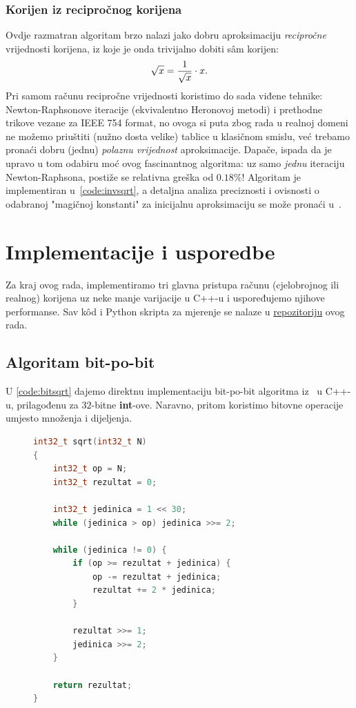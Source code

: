 \documentclass[12pt]{scrartcl}
\begin{document}
\subsubsection{Korijen iz recipročnog korijena}
Ovdje razmatran
algoritam brzo nalazi jako dobru aproksimaciju \emph{recipročne} vrijednosti korijena, iz koje je onda trivijalno dobiti s\^am korijen:
\begin{equation}
    \sqrt{x} = \frac{1}{\sqrt{x}} \cdot x\text.
\end{equation}
Pri samom računu recipročne vrijednosti koristimo do sada viđene tehnike: Newton-Raphsonove iteracije (ekvivalentno Heronovoj metodi) i prethodne
trikove vezane za IEEE 754 format, no ovoga si puta zbog rada u realnoj domeni ne možemo priuštiti (nužno dosta velike) tablice u klasičnom smislu,
već trebamo pronaći dobru (jednu)
\emph{polaznu vrijednost} aproksimacije. Dapače, ispada da je upravo u tom odabiru moć ovog fascinantnog algoritma: uz samo \emph{jednu} iteraciju
Newton-Raphsona, postiže se relativna greška od $0.18\%$! Algoritam je implementiran u~\autoref{code:invsqrt}, a detaljna analiza preciznosti i ovisnosti
o odabranoj "magičnoj konstanti" za inicijalnu aproksimaciju se može pronaći u~\cite{lomont}.

\section{Implementacije i usporedbe}
Za kraj ovog rada, implementiramo tri glavna pristupa računu (cjelobrojnog ili realnog) korijena uz neke manje varijacije
u C++-u i uspoređujemo njihove performanse. Sav k\^od i Python skripta za mjerenje se nalaze u
\href{https://github.com/mraguzin/mathsoft-esej2}{repozitoriju} ovog rada.

\subsection{Algoritam bit-po-bit}
U \autoref{code:bitsqrt} dajemo direktnu implementaciju bit-po-bit algoritma iz~\cite{guysqrt} u C++-u, pri\-la\-gođe\-nu za $32$-bitne \textbf{int}-ove.
Naravno, pritom koristimo bitovne operacije umjesto množenja i dijeljenja.
\begin{figure}[h]
\begin{lstlisting}[language=C++, label=code:bitsqrt, caption=Bit-po-bit algoritam u C++-u]
int32_t sqrt(int32_t N)
{
	int32_t op = N;
	int32_t rezultat = 0;

	int32_t jedinica = 1 << 30;
	while (jedinica > op) jedinica >>= 2;

	while (jedinica != 0) {
		if (op >= rezultat + jedinica) {
			op -= rezultat + jedinica;
			rezultat += 2 * jedinica;
		}

		rezultat >>= 1;
		jedinica >>= 2;
	}

	return rezultat;
}
\end{lstlisting}
\end{figure}
\end{document}
